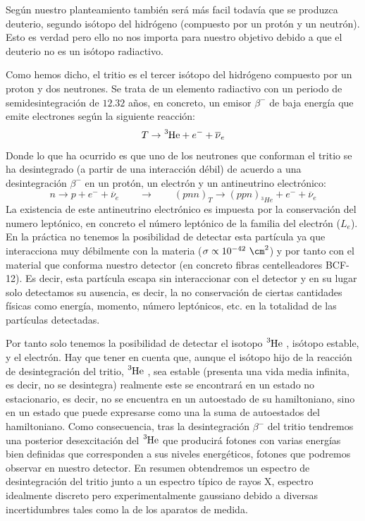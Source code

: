 Según nuestro planteamiento también será más facil todavía que se produzca deuterio, segundo isótopo del hidrógeno (compuesto por un protón y un neutrón). Esto es verdad pero ello no nos importa para nuestro objetivo debido a que el deuterio no es un isótopo radiactivo.

Como hemos dicho, el tritio es el tercer isótopo del hidrógeno compuesto por un proton y dos neutrones. Se trata de un elemento radiactivo con un periodo de semidesintegración de $12.32$ años, en concreto, un emisor $\beta^-$ de baja energía que emite electrones según la siguiente reacción:
\begin{equation}
T \rightarrow \ce{^{3}He} + e^- + \overline{\nu}_e
\label{desintegraciontritio}
\end{equation}
Donde lo que ha ocurrido es que uno de los neutrones que conforman el tritio se ha desintegrado (a partir de una interacción débil) de acuerdo a una desintegración $\beta^-$ en un protón, un electrón y un antineutrino electrónico:
\begin{equation}
n \rightarrow p + e^- + \overline{\nu}_e \qquad \rightarrow \qquad (pnn)_T\rightarrow (ppn)_{^3He} + e^- + \overline{\nu}_e 
\label{desintegracionbeta}
\end{equation}
La existencia de este antineutrino electrónico es impuesta por la conservación del numero leptónico, en concreto el número leptónico de la familia del electrón ($L_e$). En la práctica no tenemos la posibilidad de detectar esta partícula ya que interacciona muy débilmente con la materia ($\sigma \propto 10^{-42}~\cm^2$) y por tanto con el material que conforma nuestro detector (en concreto fibras centelleadores BCF-12). Es decir, esta partícula escapa sin interaccionar con el detector y en su lugar solo detectamos su ausencia, es decir, la no conservación de ciertas cantidades físicas como energía, momento, número leptónicos, etc. en la totalidad de las partículas detectadas.

Por tanto solo tenemos la posibilidad de detectar el isotopo $\ce{^3He}$ , isótopo estable, y el electrón. Hay que tener en cuenta que, aunque el isótopo hijo de la reacción de desintegración del tritio, $\ce{^3He}$ , sea estable (presenta una vida media infinita, es decir, no se desintegra) realmente este se encontrará en un estado no estacionario, es decir, no se encuentra en un autoestado de su hamiltoniano, sino en un estado que puede expresarse como una la suma de autoestados del hamiltoniano. Como consecuencia, tras la desintegración $\beta^-$ del tritio tendremos una posterior desexcitación del $\ce{^3He}$ que producirá fotones con varias energías bien definidas que corresponden a sus niveles energéticos, fotones que podremos observar en nuestro detector. En resumen obtendremos un espectro de desintegración del tritio junto a un espectro típico de rayos X, espectro idealmente discreto pero experimentalmente gaussiano debido a diversas incertidumbres tales como la de los aparatos de medida.


